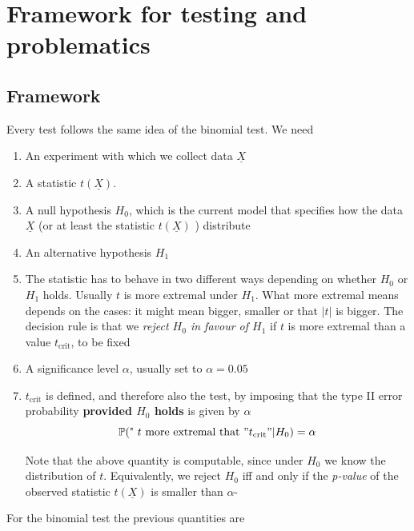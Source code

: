 	\section{ Framework for testing and problematics}
		\label{s:general_framework}
		\subsection{Framework}
	Every test follows the same idea of the binomial test. We need 
	\begin{enumerate}
	\item 	\label{i:1} An experiment with which we collect data $\underline X$  
	\item	 \label{i:2} A statistic $t(\underline X)$. 
	\item	\label{i:3}  A null hypothesis $H_0$, which is the current model that specifies how the data $\underline X$  (or at least the statistic $t(\underline X)$ ) distribute 
	\item 	\label{i:4} An alternative hypothesis $H_1$ 
	\item 	\label{i:5} The statistic has to behave in two different ways depending on whether $H_0$ or $H_1$ holds. Usually $t$ is more extremal under $H_1$. What more extremal means depends on the cases: it might mean bigger, smaller or that $|t|$ is bigger. The decision rule is that we \emph{reject $H_0$ in favour of $H_1$} if $t$ is more extremal than a value $t_\text{crit}$, to be fixed
	\item 	\label{i:6}A significance level $\alpha$, usually set to $\alpha = 0.05$ 

	\item \label{i:7} $t_\text{crit}$ is defined, and therefore also the test, by imposing that the type II error probability \textbf{provided $H_0$ holds } is given by $\alpha$
	\begin{equation}
			\label{e:tcrit}
			\mathbb P(\text{" $t$ more extremal that $"t_{\text{crit}}$}"|H_0)  = \alpha
	\end{equation}

	Note that the above quantity is computable, since under $H_0$ we know the distribution of $t$. Equivalently, we reject $H_0$ iff and only if the \emph{p-value} of the observed statistic $t(\underline X)$ is smaller than $\alpha$- 
	\end{enumerate}
		For the binomial test the previous quantities are 
